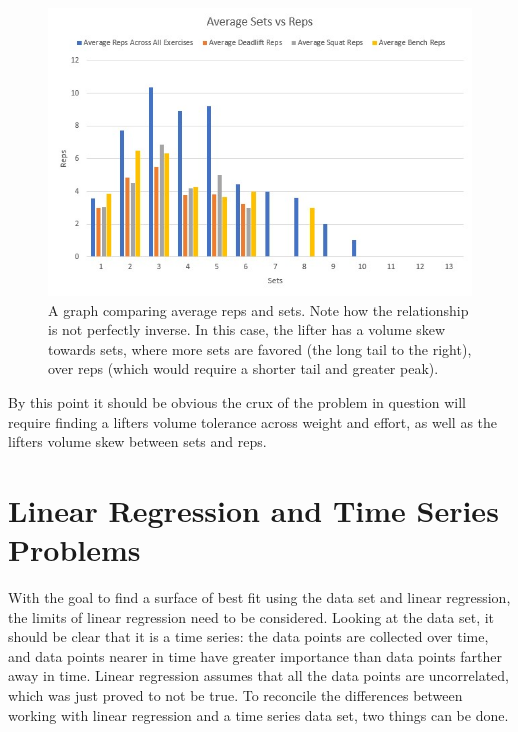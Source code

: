 \begin{figure}[h]
    \centering
    \includegraphics[scale=1.6]{graphs/SetsVsRepsGraph.jpg}
    \caption{A graph comparing average reps and sets. Note how the relationship is not perfectly inverse. In this case, the lifter has a volume skew towards sets, where more sets are favored (the long tail to the right), over reps (which would require a shorter tail and greater peak).}
    \label{fig:SetsVsReps}
\end{figure}

By this point it should be obvious the crux of the problem in question will require finding a lifters volume tolerance across weight and effort, as well as the lifters volume skew between sets and reps.

\section{Linear Regression and Time Series Problems}
\label{sec:PotentialSurfaceLinearRegressionAndTimeSeriesProblems}

With the goal to find a surface of best fit using the data set and linear regression, the limits of linear regression need to be considered. Looking at the data set, it should be clear that it is a time series: the data points are collected over time, and data points nearer in time have greater importance than data points farther away in time. Linear regression assumes that all the data points are uncorrelated, which was just proved to not be true. To reconcile the differences between working with linear regression and a time series data set, two things can be done.

